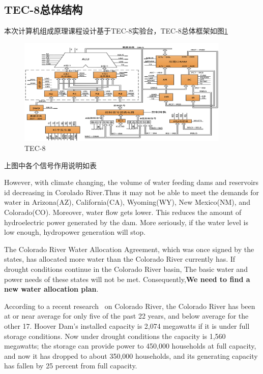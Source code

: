 \subsection{TEC-8总体结构}
本次计算机组成原理课程设计基于TEC-8实验台，TEC-8总体框架如图\ref{fig:construction_of_tec8}

\begin{figure}[H]
    \centering
    \label{fig:construction_of_tec8}
    \includegraphics[width=0.9\textwidth]{figures/chapter1/QQ20220828-115423@2x.png}
    \caption{TEC-8}
\end{figure}

上图中各个信号作用说明如表




However, with climate changing, the volume of water feeding dams and reservoirs id decreasing in Corolado River.Thus it may not be able to meet the demands for water in Arizona(AZ), California(CA), Wyoming(WY), New Mexico(NM), and Colorado(CO). Moreover, water flow gets lower. This reduces the amount of hydroelectric power generated by the dam. More seriously, 
if the water level is low enough, hydropower generation will stop.



The Colorado River Water Allocation Agreement, which was once signed by the states, has allocated more water than the Colorado River currently has. If drought conditions continue in the Colorado River basin, The basic water and power needs of these states will not be met. Consequently,\textbf{We need to find a new water allocation plan}.


According to a recent research~\cite{whitepaper} on Colorado River, the Colorado River has been at or near average for only five of the past 22 years, and below average for the other 17. Hoover Dam's installed capacity is 2,074 megawatts if it is under full storage conditions. Now under drought conditions the capacity is 1,560 megawatts; the storage can provide power to 450,000 households at full capacity, and now it has dropped to about 350,000 households, and its generating capacity has fallen by 25 percent from full capacity.